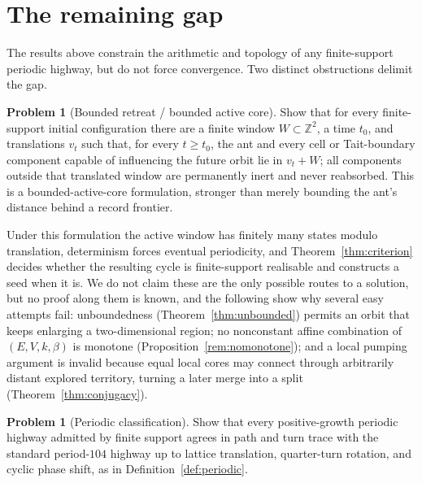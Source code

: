 \documentclass[11pt,reqno]{amsart}
\theoremstyle{plain}
\theoremstyle{definition}
\newtheorem{problem}[theorem]{Problem}
\newcommand{\Z}{\mathbb{Z}}
\begin{document}
\section{The remaining gap}\label{sec:gap}

The results above constrain the arithmetic and topology of any finite-support
periodic highway, but do not force convergence. Two distinct obstructions delimit the
gap.

\begin{problem}[Bounded retreat / bounded active core]\label{prob:retreat}
Show that for every finite-support initial configuration there are a finite window
$W\subset\Z^2$, a time $t_0$, and translations $v_t$ such that, for every
$t\ge t_0$, the ant and every cell or Tait-boundary component capable of influencing
the future orbit lie in $v_t+W$; all components outside that translated window are
permanently inert and never reabsorbed. This is a bounded-active-core formulation,
stronger than merely bounding the ant's distance behind a record frontier.
\end{problem}

Under this formulation the active window has finitely many states modulo
translation, determinism forces eventual periodicity, and Theorem~\ref{thm:criterion}
decides whether the resulting cycle is finite-support realisable and constructs a
seed when it is. We do not claim these are the only possible routes to a
solution, but no proof along them is known, and the following show why several easy
attempts fail: unboundedness (Theorem~\ref{thm:unbounded}) permits an orbit that keeps
enlarging a two-dimensional region; no nonconstant affine combination of
$(E,V,k,\beta)$ is monotone (Proposition~\ref{rem:nomonotone});
and a local pumping argument is invalid because equal local cores may connect through
arbitrarily distant explored territory, turning a later merge into a split
(Theorem~\ref{thm:conjugacy}).

\begin{problem}[Periodic classification]\label{prob:periodic}
Show that every positive-growth periodic highway admitted by finite support agrees
in path and turn trace with the standard period-$104$ highway up to lattice
translation, quarter-turn rotation, and cyclic phase shift, as in
Definition~\ref{def:periodic}.
\end{problem}
\end{document}
